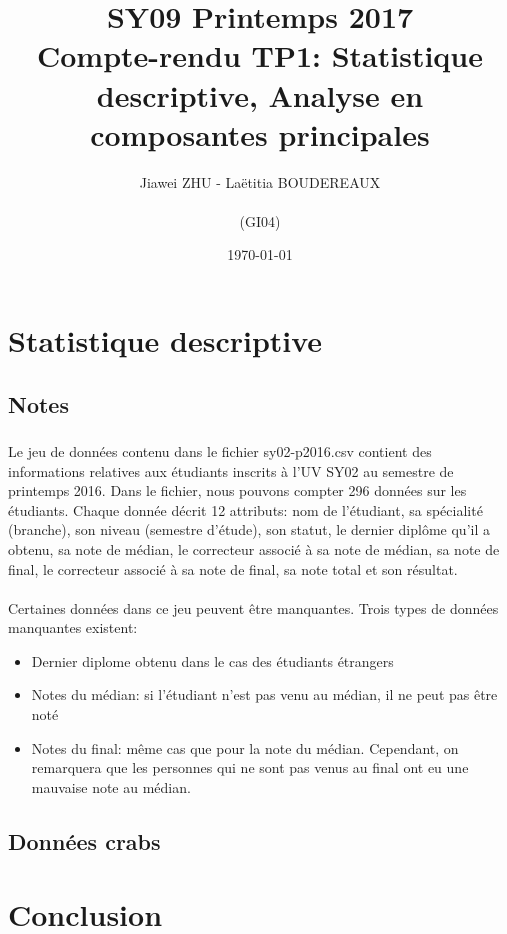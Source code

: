 \documentclass[titlepage]{article}
\begin{document}
\title{SY09 Printemps 2017\\Compte-rendu TP1: Statistique descriptive, Analyse en composantes principales}
\author{Jiawei ZHU - Laëtitia BOUDEREAUX\\\\(GI04)}
\date{\today}
\maketitle

\section{Statistique descriptive}
\subsection{Notes}
\subsubsection{}
Le jeu de données contenu dans le fichier sy02-p2016.csv contient des informations relatives aux
étudiants inscrits à l’UV SY02 au semestre de printemps 2016. Dans le fichier, nous pouvons compter 296 données sur les étudiants. Chaque donnée décrit 12 attributs: nom de l'étudiant, sa spécialité (branche), son niveau (semestre d'étude), son statut, le dernier diplôme qu'il a obtenu, sa note de médian, le correcteur associé à sa note de médian, sa note de final, le correcteur associé à sa note de final, sa note total et son résultat.
\paragraph{}
Certaines données dans ce jeu peuvent être manquantes. Trois types de données manquantes existent:
\begin{itemize}
\item Dernier diplome obtenu dans le cas des étudiants étrangers
\item Notes du médian: si l'étudiant n'est pas venu au médian, il ne peut pas être noté
\item Notes du final: même cas que pour la note du médian. Cependant, on remarquera que les personnes qui ne sont pas venus au final ont eu une mauvaise note au médian.
\end{itemize}
\subsection{Données crabs}
\section{Conclusion}
\end{document}

